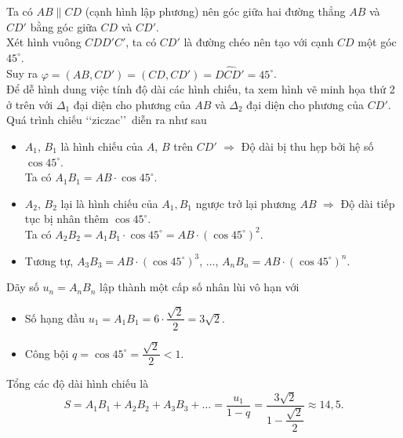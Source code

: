 \begin{ex}
{\begin{center}
		\end{center}
		\noindent
		Ta có $AB \parallel CD$ (cạnh hình lập phương) nên góc giữa hai đường thẳng $AB$ và $CD'$ bằng góc giữa $CD$ và $CD'$.\\
		Xét hình vuông $CDD'C'$, ta có $CD'$ là đường chéo nên tạo với cạnh $CD$ một góc $45^\circ$. \\
		Suy ra $\varphi = (AB,CD')=(CD,CD')= \widehat{DCD'} = 45^\circ$.\\
		Để dễ hình dung việc tính độ dài các hình chiếu, ta xem hình vẽ minh họa thứ 2 ở trên với $\Delta_1$ đại diện cho phương của $AB$ và $\Delta_2$ đại diện cho phương của $CD'$. Quá trình chiếu \lq\lq ziczac\rq\rq\ diễn ra như sau
		\begin{itemize}
			\item $A_1$, $B_1$ là hình chiếu của $A$, $B$ trên $CD'$ $\Rightarrow$ Độ dài bị thu hẹp bởi hệ số $\cos 45^\circ$. \\
			Ta có $A_1B_1 = AB \cdot \cos 45^\circ$.
			\item $A_2$, $B_2$ lại là hình chiếu của $A_1, B_1$ ngược trở lại phương $AB$ $\Rightarrow$ Độ dài tiếp tục bị nhân thêm $\cos 45^\circ$.\\
			Ta có $A_2B_2 = A_1B_1 \cdot \cos 45^\circ = AB \cdot (\cos 45^\circ)^2$.
			\item Tương tự, $A_3B_3 = AB \cdot (\cos 45^\circ)^3$, $\ldots$, $A_nB_n = AB \cdot (\cos 45^\circ)^n$.
		\end{itemize}
		Dãy số $u_n = A_n B_n$ lập thành một cấp số nhân lùi vô hạn với
		\begin{itemize}
			\item Số hạng đầu $u_1 = A_1B_1 = 6 \cdot \dfrac{\sqrt{2}}{2} = 3\sqrt{2}$.
			\item Công bội $q = \cos 45^\circ = \dfrac{\sqrt{2}}{2} < 1$.
		\end{itemize}
		Tổng các độ dài hình chiếu là
		\[S = A_1B_1 + A_2B_2 + A_3B_3 + \dots = \dfrac{u_1}{1-q} = \dfrac{3\sqrt{2}}{1-\dfrac{\sqrt{2}}{2}}\approx 14{,}5.\]
	}
\end{ex}

